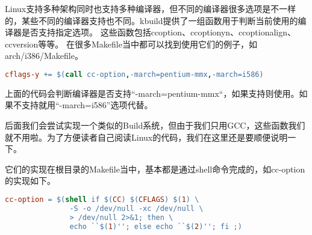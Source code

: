 Linux支持多种架构同时也支持多种编译器，但不同的编译器很多选项是不一样的，某些不同的编译器支持也不同。kbuild提供了一组函数用于判断当前使用的编译器是否支持指定选项。
这些函数包括cc\-option、cc\-option\-yn、cc\-option\-align、cc\-version等等。
在很多Makefile当中都可以找到使用它们的例子，如arch/i386/Makefile。
\begin{lstlisting}[language=make]
cflags-y += $(call cc-option,-march=pentium-mmx,-march=i586)
\end{lstlisting}
上面的代码会判断编译器是否支持“-march=pentium-mmx“，如果支持则使用。如果不支持就用“-march=i586”选项代替。

后面我们会尝试实现一个类似的Build系统，但由于我们只用GCC，这些函数我们就不用啦。为了方便读者自己阅读Linux的代码，我们在这里还是要顺便说明一下。


它们的实现在根目录的Makefile当中，基本都是通过shell命令完成的，如cc-option的实现如下。
\begin{lstlisting}[language=make]
cc-option = $(shell if $(CC) $(CFLAGS) $(1) \
               -S -o /dev/null -xc /dev/null \
               > /dev/null 2>&1; then \
               echo ``$(1)''; else echo ``$(2)''; fi ;)

\end{lstlisting}



